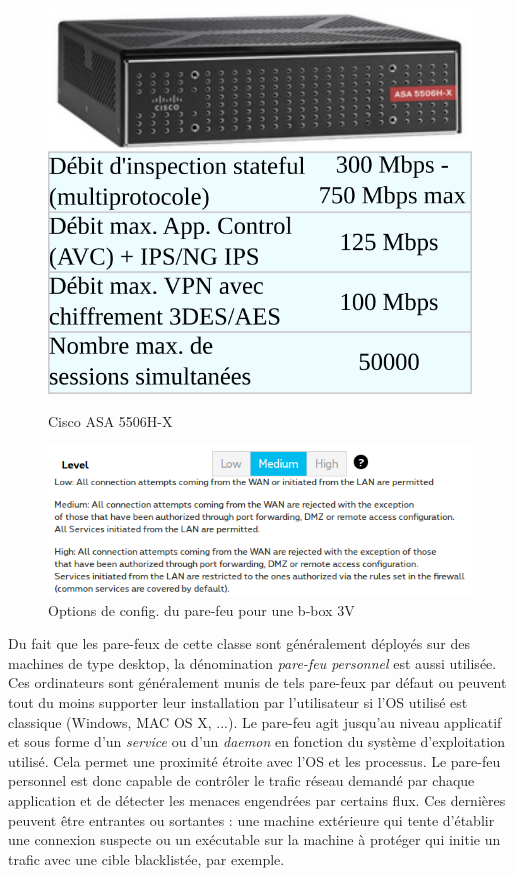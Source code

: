 \documentclass[]{article}
\newcommand{\minit}[1]{\noindent{\small\textbf{ \underline{#1}}}\vspace{0.2cm}}
\begin{document}
\begin{figure}[!ht]
\centering
\begin{minipage}{.4\textwidth}
  \centering
  \includegraphics[width=.6\linewidth]{desc_cisco_ASA-5506H-X.png}
  \caption{Cisco ASA 5506H-X}
  \label{cisco_FW}
\end{minipage}%
\begin{minipage}{.6\textwidth}
  \centering
  \includegraphics[width=1.0\linewidth]{proximus_FW.png}
  \caption{Options de config. du pare-feu pour une b-box 3V}
  \label{proxi_FW}
\end{minipage}
\end{figure}


\minit{Les pare-feux niveau hôte}

\par Du fait que les pare-feux de cette classe sont généralement déployés sur des machines de type desktop, la dénomination \textit{pare-feu personnel} est aussi utilisée. Ces ordinateurs sont généralement munis de tels pare-feux par défaut ou peuvent tout du moins supporter leur installation par l'utilisateur si l'OS utilisé est classique (Windows, MAC OS X, ...). Le pare-feu agit jusqu'au niveau applicatif \cite{Kokko2017} et sous forme d'un \textit{service} ou d'un \textit{daemon} en fonction du système d'exploitation utilisé. Cela permet une proximité étroite avec l'OS et les processus. Le pare-feu personnel est donc capable de contrôler le trafic réseau demandé par chaque application et de détecter les menaces engendrées par certains flux. Ces dernières peuvent être entrantes ou sortantes : une machine extérieure qui tente d'établir une connexion suspecte ou un exécutable sur la machine à protéger qui initie un trafic avec une cible blacklistée, par exemple.\\
\end{document}

